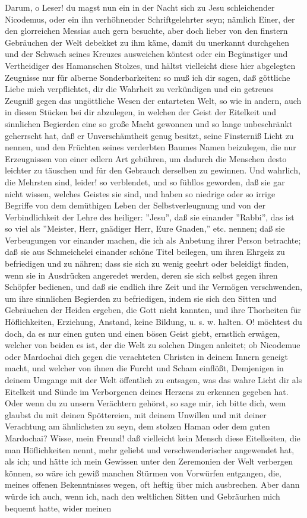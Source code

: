 Darum, o Leser! du magst nun ein in der Nacht sich zu Jesu schleichender Nicodemus, oder ein ihn verhöhnender Schriftgelehrter seyn; nämlich Einer, der den glorreichen Messias auch gern besuchte, aber doch lieber von den finstern Gebräuchen der Welt debekket zu ihm käme, damit du unerkannt durchgehen und der Schwach seines Kreuzes ausweichen köntest oder ein Begünstiger und Vertheidiger des Hamanschen Stolzes, und hältst vielleicht diese hier abgelegten Zeugnisse nur für alberne Sonderbarkeiten: so muß ich dir sagen, daß göttliche Liebe mich verpflichtet, dir die Wahrheit zu verkündigen und ein getreues Zeugniß gegen das ungöttliche Wesen der entarteten Welt, so wie in andern, auch in diesen Stücken bei dir abzulegen, in welchen der Geist der Eitelkeit und sinnlichen Begierden eine so große Macht gewonnen und so lange unbeschränkt geherrscht hat, daß er Unverschämtheit genug besitzt, seine Finsterniß Licht zu nennen, und den Früchten seines verderbten Baumes Namen beizulegen, die nur Erzeugnissen von einer edlern Art gebühren, um dadurch die Menschen desto leichter zu täuschen und für den Gebrauch derselben zu gewinnen. Und wahrlich, die Mehrsten sind, leider! so verblendet, und so fühllos geworden, daß sie gar nicht wissen, welches Geistes sie sind, und haben so niedrige oder so irrige Begriffe von dem demüthigen Leben der Selbstverleugnung und von der Verbindlichkeit der Lehre des heiliger: ''Jesu'', daß sie einander ''Rabbi'', das ist so viel als ''Meister, Herr, gnädiger Herr, Eure Gnaden,'' etc. nennen; daß sie Verbeugungen vor einander machen, die ich als Anbetung ihrer Person betrachte; daß sie aus Schmeichelei einander schöne Titel beilegen, um ihren Ehrgeiz zu befriedigen und zu nähren; dass sie sich zu wenig geehrt oder beleidigt finden, wenn sie in Ausdrücken angeredet werden, deren sie sich selbst gegen ihren Schöpfer bedienen, und daß sie endlich ihre Zeit und ihr Vermögen verschwenden, um ihre sinnlichen Begierden zu befriedigen, indem sie sich den Sitten und Gebräuchen der Heiden ergeben, die Gott nicht kannten, und ihre Thorheiten für Höflichkeiten, Erziehung, Anstand, keine Bildung, u. s. w. halten. O! möchtest du doch, da es nur einen guten und einen bösen Geist giebt, ernstlich erwägen, welcher von beiden es ist, der die Welt zu solchen Dingen anleitet; ob Nicodemue oder Mardochai dich gegen die verachteten Christen in deinem Innern geneigt macht, und welcher von ihnen die Furcht und Scham einflößt, Demjenigen in deinem Umgange mit der Welt öffentlich zu entsagen, was das wahre Licht dir als Eitelkeit und Sünde im Verborgenen deines Herzens zu erkennen gegeben hat. Oder wenn du zu unsern Verächtern gehörst, so sage mir, ich bitte dich, wem glaubst du mit deinen Spöttereien, mit deinem Unwillen und mit deiner Verachtung am ähnlichsten zu seyn, dem stolzen Haman oder dem guten Mardochai? Wisse, mein Freund! daß vielleicht kein Mensch diese Eitelkeiten, die man Höflichkeiten nennt, mehr geliebt und verschwenderischer angewendet hat, als ich; und hätte ich mein Gewissen unter den Zeremonien der Welt verbergen können, so wäre ich gewiß manchen Stürmen von Vorwürfen entgangen, die, meines offenen Bekenntnisses wegen, oft heftig über mich ausbrechen. Aber dann würde ich auch, wenn ich, nach den weltlichen Sitten und Gebräurhen mich bequemt hatte, wider meinen 